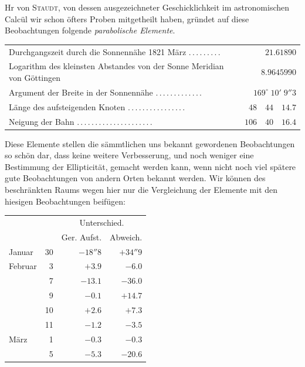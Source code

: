 Hr von \textsc{Staudt}, von dessen ausgezeichneter Geschicklichkeit im astronomischen Calcül wir schon öfters Proben mitgetheilt haben, gründet auf diese Beobachtungen folgende \emph{parabolische Elemente}.

\begin{center}
\small
\begin{tabular}{p{.73\linewidth}r}
Durchgangszeit durch die Sonnennähe 1821 März \mbox{.\,.\,.\,.\,.\,.\,.\,.\,.} & $21.61890$ \\
Logarithm des kleinsten Abstandes von der Sonne Meridian von Göttingen & $8.9645990$ \\
Argument der Breite in der Sonnennähe \mbox{.\,.\,.\,.\,.\,.\,.\,.\,.\,.\,.\,.\,.} & $169^\circ\;10'\;9''3$ \\
Länge des aufsteigenden Knoten \mbox{.\,.\,.\,.\,.\,.\,.\,.\,.\,.\,.\,.\,.\,.\,.\,.} & $48\quad44\quad14.7$ \\
Neigung der Bahn \mbox{.\,.\,.\,.\,.\,.\,.\,.\,.\,.\,.\,.\,.\,.\,.\,.\,.\,.\,.\,.\,.} & $106\quad40\quad16.4$ \\
\end{tabular}
\end{center}

Diese Elemente stellen die sämmtlichen uns bekannt gewordenen Beobachtungen so schön dar, dass keine weitere Verbesserung, und noch weniger eine Bestimmung der Ellipticität, gemacht werden kann, wenn nicht noch viel spätere gute Beobachtungen von andern Orten bekannt werden. Wir können des beschränkten Raums wegen hier nur die Vergleichung der Elemente mit den hiesigen Beobachtungen beifügen:

\begin{center}
\begin{tabular}{lr|r|r}
& & \multicolumn{2}{c}{Unterschied.} \\
& & Ger. Aufst. & Abweich. \\
\hline
Januar & 30 & $-18''8$ & $+34''9$ \\
Februar & 3 & $+3.9$ & $-6.0$ \\
& 7 & $-13.1$ & $-36.0$ \\
& 9 & $-0.1$ & $+14.7$ \\
& 10 & $+2.6$ & $+7.3$ \\
& 11 & $-1.2$ & $-3.5$ \\
März & 1 & $-0.3$ & $-0.3$ \\
& 5 & $-5.3$ & $-20.6$ \\
\end{tabular}
\end{center}

